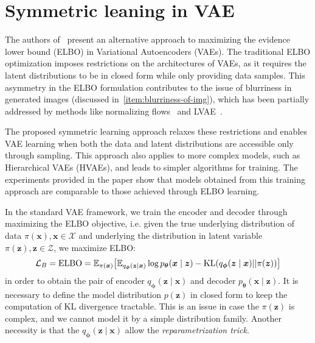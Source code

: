 \section{Symmetric leaning in VAE}
\label{sec:symmetric_learning}
The authors of~\cite{sym-learning-2023} present an alternative approach to maximizing the evidence lower bound (ELBO)
in Variational Autoencoders (VAEs). The traditional ELBO optimization imposes restrictions on the architectures of 
VAEs, as it requires the latent distributions to be in closed form while only providing data samples. This asymmetry in
the ELBO formulation contributes to the issue of blurriness in generated images (discussed in~\ref{item:blurriness-of-img}),
which has been partially addressed by methods like normalizing flows~\cite{nf-2015} and LVAE~\cite{lvae-2016}.

The proposed symmetric learning approach relaxes these restrictions and enables VAE learning when both the data and 
latent distributions are accessible only through sampling. This approach also applies to more complex models, such 
as Hierarchical VAEs (HVAEs), and leads to simpler algorithms for training. The experiments provided in the paper show that models obtained 
from this training approach are comparable to those achieved through ELBO learning.

In the standard VAE framework, we train the encoder  and decoder through maximizing the ELBO objective, i.e.
given the true underlying distribution of data $\pi(\boldsymbol{x}), \boldsymbol{x} \in \mathcal{X}$ and underlying
the distribution in latent variable $\pi(\boldsymbol{z}), \boldsymbol{z} \in \mathcal{Z}$, we maximize ELBO:
$$
\mathcal{L}_{B} = \mathrm{ELBO} = \operatorname{\mathbb{E}}_{\pi(\boldsymbol{x})} \bigl[ \operatorname{\mathbb{E}}_{q_{\boldsymbol{\phi}}(\boldsymbol{z} \mid \boldsymbol{x})} 
\log p_{\boldsymbol{\theta}}(\boldsymbol{x} \mid \boldsymbol{z}) - \mathrm{KL} (q_{\boldsymbol{\phi}}(\boldsymbol{z} \mid \boldsymbol{x}) || 
\pi(\boldsymbol{z})) \bigr]
$$
in order to obtain the pair of encoder $q_{\boldsymbol{\phi}}(\boldsymbol{z} \mid \boldsymbol{x})$ and decoder
$p_{\boldsymbol{\theta}}(\boldsymbol{x} \mid \boldsymbol{z})$. It is necessary to define the model distribution $p(\boldsymbol{z})$ in 
closed form to keep the computation of KL divergence tractable. This is an issue in case the $\pi(\boldsymbol{z})$ is complex, and we cannot model it 
by a simple distribution family.  Another necessity is that the $q_{\boldsymbol{\phi}}(\boldsymbol{z} \mid \boldsymbol{x})$ allow the 
\textit{reparametrization trick}. 

